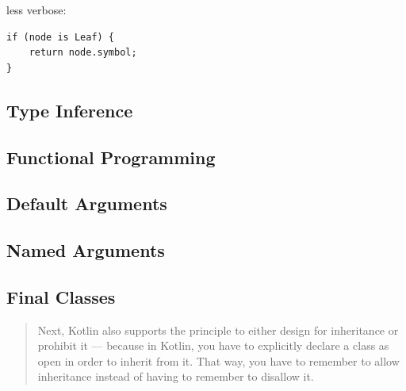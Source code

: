 \documentclass[11pt, a4paper]{report}
\begin{document}
less verbose:

\begin{lstlisting}
if (node is Leaf) {
    return node.symbol;
}
\end{lstlisting}

\subsection{Type Inference}

\subsection{Functional Programming}

\subsection{Default Arguments}

\subsection{Named Arguments}

\subsection{Final Classes}

\begin{quotation}
Next, Kotlin also supports the principle to either design for inheritance or prohibit it — because in Kotlin, you have to explicitly declare a class as open in order to inherit from it. That way, you have to remember to allow inheritance instead of having to remember to disallow it.\cite{kotlin-sommerhoff}
\end{quotation}

\listoffigures
\end{document}
